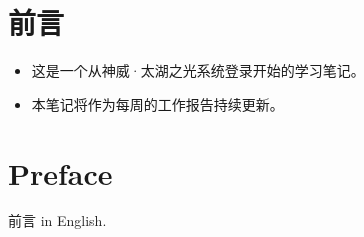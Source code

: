 \maketitle%
\MAKETITLE%
\intobmk\chapter*{前\quad 言}%
\setcounter{page}{1}%
\begin{itemize}
    \item 这是一个从神威·太湖之光系统登录开始的学习笔记。
    \item 本笔记将作为每周的工作报告持续更新。
\end{itemize}

\intobmk\chapter*{Preface}%

前言 in English.


